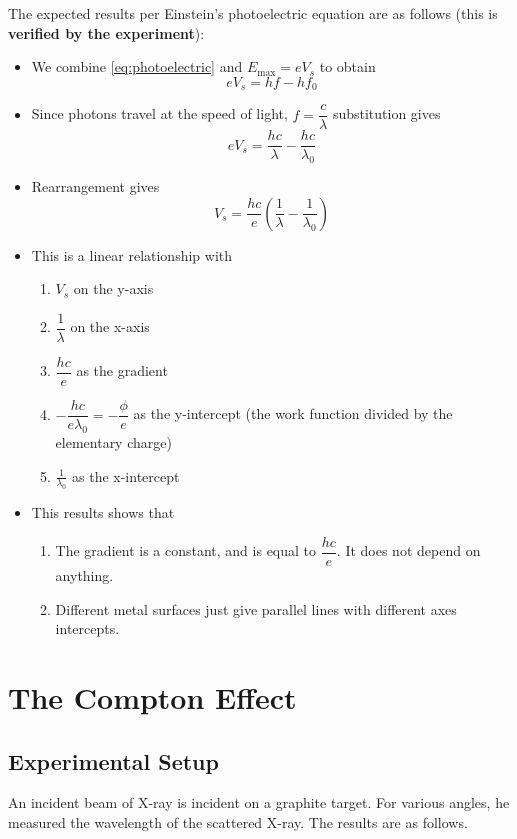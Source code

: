 \documentclass[a4paper,12pt]{article}
\let\oldsection\section
\renewcommand\section{\clearpage\oldsection}
\newcommand{\paren}[1]{\left(#1\right)}
\begin{document}
The expected results per Einstein's photoelectric equation are as follows (this is \textbf{verified by the experiment}):
\begin{itemize}
  \item We combine \cref{eq:photoelectric} and $E_{\max} = eV_s$ to obtain
        $$
          eV_s = hf - hf_0
        $$
  \item Since photons travel at the speed of light, $f = \dfrac{c}{\lambda}$ substitution gives
        $$
          eV_s = \dfrac{hc}{\lambda} -\dfrac{hc}{\lambda_0}
        $$
  \item Rearrangement gives
        $$
          V_s = \dfrac{hc}{e}\paren{\dfrac{1}{\lambda} - \dfrac{1}{\lambda_0}}
        $$
  \item This is a linear relationship with
        \begin{enumerate}
          \item $V_s$ on the y-axis
          \item $\dfrac{1}{\lambda}$ on the x-axis
          \item $\dfrac{hc}{e}$ as the gradient
          \item $-\dfrac{hc}{e\lambda_0} = -\dfrac{\phi}{e}$ as the y-intercept (the work function divided by the elementary charge)
          \item $\frac{1}{\lambda_0}$ as the x-intercept
        \end{enumerate}
  \item This results shows that
        \begin{enumerate}
          \item The gradient is a constant, and is equal to $\dfrac{hc}{e}$. It does not depend on anything.
          \item Different metal surfaces just give parallel lines with different axes intercepts.
        \end{enumerate}
\end{itemize}


\section{The Compton Effect}

\subsection{Experimental Setup}

An incident beam of X-ray is incident on a graphite target. For various angles, he measured the wavelength of the scattered X-ray. The results are as follows.
\end{document}
